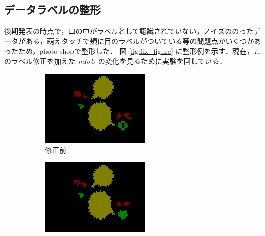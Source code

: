 \documentclass[onecolumn]{ujarticle}   %
\begin{document}
	\subsection{データラベルの整形}
	後期発表の時点で，口の中がラベルとして認識されていない，ノイズののったデータがある，萌えタッチで頬に目のラベルがついている等の問題点がいくつかあったため，photo shopで整形した．
	図 \ref{fig:fix_figure} に整形例を示す．現在，このラベル修正を加えた {\it mIoU} の変化を見るために実験を回している．
	\begin{figure}[h]
		\centering
		\vspace{-7mm}
		\begin{subfigure}{0.45\columnwidth}
			\centering
			\includegraphics[width=1.0\columnwidth]{before_mouth.png}
			\caption{修正前}
		\end{subfigure}
		\begin{subfigure}{0.45\columnwidth}
			\centering
			\includegraphics[width=1.0\columnwidth]{after_mouth.png}

\end{subfigure}
\end{figure}
\end{document}
